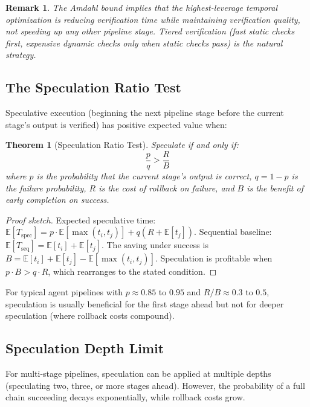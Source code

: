 \documentclass[11pt, a4paper]{googledeepmind}
\newtheorem{theorem}{Theorem}[section]
\newtheorem*{remark}{Remark}
\begin{document}
\begin{remark}
The Amdahl bound implies that the highest-leverage temporal optimization is reducing verification time while maintaining verification quality, not speeding up any other pipeline stage. Tiered verification (fast static checks first, expensive dynamic checks only when static checks pass) is the natural strategy.
\end{remark}

\subsection{The Speculation Ratio Test}

Speculative execution (beginning the next pipeline stage before the current stage's output is verified) has positive expected value when:

\begin{theorem}[Speculation Ratio Test]
\label{thm:speculation}
Speculate if and only if:
\begin{equation}
    \frac{p}{q} > \frac{R}{B}
\end{equation}
where $p$ is the probability that the current stage's output is correct, $q = 1 - p$ is the failure probability, $R$ is the cost of rollback on failure, and $B$ is the benefit of early completion on success.
\end{theorem}

\begin{proof}[Proof sketch]
Expected speculative time: $\mathbb{E}[T_{\mathrm{spec}}] = p \cdot \mathbb{E}[\max(t_i, t_j)] + q(R + \mathbb{E}[t_j])$. Sequential baseline: $\mathbb{E}[T_{\mathrm{seq}}] = \mathbb{E}[t_i] + \mathbb{E}[t_j]$. The saving under success is $B = \mathbb{E}[t_i] + \mathbb{E}[t_j] - \mathbb{E}[\max(t_i, t_j)]$. Speculation is profitable when $p \cdot B > q \cdot R$, which rearranges to the stated condition.
\end{proof}

For typical agent pipelines with $p \approx 0.85$ to $0.95$ and $R/B \approx 0.3$ to $0.5$, speculation is usually beneficial for the first stage ahead but not for deeper speculation (where rollback costs compound).

\subsection{Speculation Depth Limit}

For multi-stage pipelines, speculation can be applied at multiple depths (speculating two, three, or more stages ahead). However, the probability of a full chain succeeding decays exponentially, while rollback costs grow.
\end{document}
